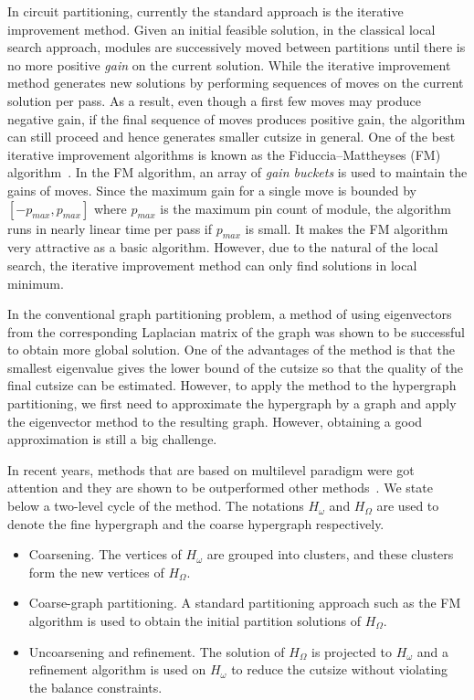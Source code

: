 \documentclass[journal]{IEEEtran}
\begin{document}
In circuit partitioning, currently the standard approach is the
iterative improvement method. Given an initial feasible
solution, in the classical local search approach, modules are
successively moved between partitions until there is no more positive
{\it gain} on the current solution. While the iterative improvement
method generates new solutions by performing sequences of moves on
the current solution per pass. As a result, even though a first few moves
may produce negative gain, if the final sequence of moves produces
positive gain, the algorithm can still proceed and hence generates
smaller cutsize in general. One of the best iterative
improvement algorithms is known as the 
Fiduccia--Mattheyses (FM) algorithm~\cite{FM_1982}.
In the FM algorithm, an array of {\it gain buckets} is used to
maintain the gains of moves. Since the maximum gain for a single
move is bounded by $[-p_{max}, p_{max}]$ where $p_{max}$ is the maximum
pin count of module, the algorithm runs in nearly linear
time per pass if $p_{max}$ is small. It makes the FM algorithm very
attractive as a basic algorithm. However, due to the natural of the
local search, the iterative improvement method can only find solutions
in local minimum.

In the conventional graph partitioning problem, a method of using
eigenvectors from the corresponding Laplacian matrix of the graph
was shown to be successful to obtain more global solution. One
of the advantages of the method is that the smallest eigenvalue gives the
lower bound of the cutsize so that the quality of the final cutsize
can be estimated. However, to apply the method to the hypergraph
partitioning, we first need to approximate the hypergraph by a graph
and apply the eigenvector method to the resulting graph. 
However, obtaining a good approximation is still a big challenge. 

In recent years, methods that are based on multilevel paradigm were 
got attention and they are shown to be outperformed other 
methods~\cite{hMetis_1999,hybrid_multilevel_genetic_1996,multilevel_alpert_1998,multilevel_edge_frequency_1998,multilevel_hierarchy_guided_2003,clustering_esc_2000,clustering_signal_flow_1997,fixed_vertices_2000,hypergraph_improved_2000}. 
We state below a two-level cycle of the method. 
The notations $H_{\omega}$ and
$H_{\Omega}$ are used to denote the fine hypergraph and the coarse
hypergraph respectively.

\begin{itemize}
\item Coarsening.
The vertices of $H_{\omega}$ are grouped into clusters,
and these clusters form the new vertices of $H_{\Omega}$.

\item Coarse-graph partitioning.
A standard partitioning approach such as the FM algorithm is used
to obtain the initial partition solutions of $H_{\Omega}$.

\item Uncoarsening and refinement.
The solution of $H_{\Omega}$ is projected to $H_{\omega}$ and a
refinement algorithm is used on $H_{\omega}$ to reduce the cutsize
without violating the balance constraints.
\end{itemize}
\end{document}
